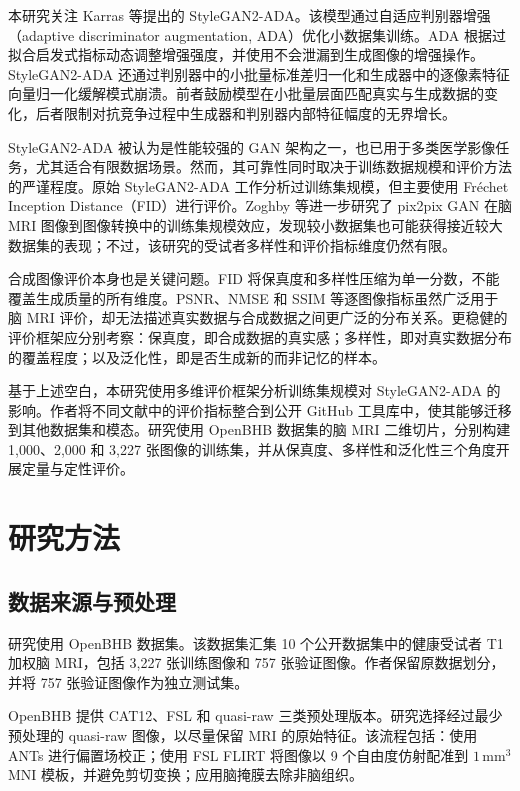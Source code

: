 \documentclass[UTF8,11pt,a4paper]{ctexart}
\begin{document}
本研究关注 Karras 等提出的 StyleGAN2-ADA。该模型通过自适应判别器增强（adaptive discriminator augmentation, ADA）优化小数据集训练。ADA 根据过拟合启发式指标动态调整增强强度，并使用不会泄漏到生成图像的增强操作。StyleGAN2-ADA 还通过判别器中的小批量标准差归一化和生成器中的逐像素特征向量归一化缓解模式崩溃。前者鼓励模型在小批量层面匹配真实与生成数据的变化，后者限制对抗竞争过程中生成器和判别器内部特征幅度的无界增长。

StyleGAN2-ADA 被认为是性能较强的 GAN 架构之一，也已用于多类医学影像任务，尤其适合有限数据场景。然而，其可靠性同时取决于训练数据规模和评价方法的严谨程度。原始 StyleGAN2-ADA 工作分析过训练集规模，但主要使用 Fr\'echet Inception Distance（FID）进行评价。Zoghby 等进一步研究了 pix2pix GAN 在脑 MRI 图像到图像转换中的训练集规模效应，发现较小数据集也可能获得接近较大数据集的表现；不过，该研究的受试者多样性和评价指标维度仍然有限。

合成图像评价本身也是关键问题。FID 将保真度和多样性压缩为单一分数，不能覆盖生成质量的所有维度。PSNR、NMSE 和 SSIM 等逐图像指标虽然广泛用于脑 MRI 评价，却无法描述真实数据与合成数据之间更广泛的分布关系。更稳健的评价框架应分别考察：保真度，即合成数据的真实感；多样性，即对真实数据分布的覆盖程度；以及泛化性，即是否生成新的而非记忆的样本。

基于上述空白，本研究使用多维评价框架分析训练集规模对 StyleGAN2-ADA 的影响。作者将不同文献中的评价指标整合到公开 GitHub 工具库中，使其能够迁移到其他数据集和模态。研究使用 OpenBHB 数据集的脑 MRI 二维切片，分别构建 1,000、2,000 和 3,227 张图像的训练集，并从保真度、多样性和泛化性三个角度开展定量与定性评价。

\section{研究方法}

\subsection{数据来源与预处理}

研究使用 OpenBHB 数据集。该数据集汇集 10 个公开数据集中的健康受试者 T1 加权脑 MRI，包括 3,227 张训练图像和 757 张验证图像。作者保留原数据划分，并将 757 张验证图像作为独立测试集。

OpenBHB 提供 CAT12、FSL 和 quasi-raw 三类预处理版本。研究选择经过最少预处理的 quasi-raw 图像，以尽量保留 MRI 的原始特征。该流程包括：使用 ANTs 进行偏置场校正；使用 FSL FLIRT 将图像以 9 个自由度仿射配准到 $1\,\mathrm{mm}^3$ MNI 模板，并避免剪切变换；应用脑掩膜去除非脑组织。
\end{document}
